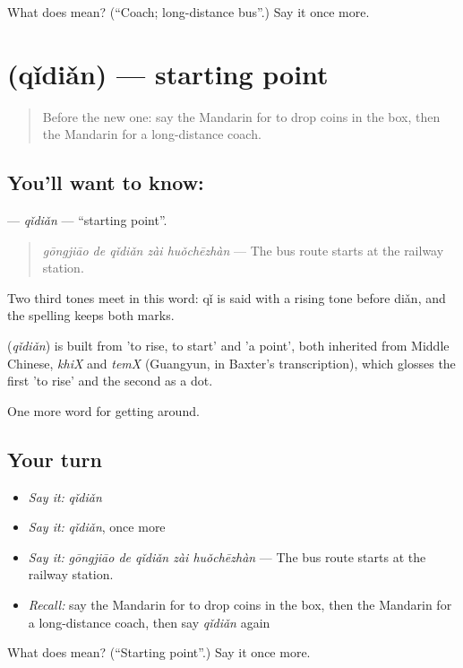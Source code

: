 \begin{tcolorbox}[breakable,colback=teal!4,colframe=teal!35!black,title={Before you move on}]
What does  mean? (\textquotedblleft{}Coach; long-distance bus\textquotedblright{}.) Say it once more.
\end{tcolorbox}
\section[\texorpdfstring{\zh{起点} (qǐdiǎn)}{起点 (qǐdiǎn)}]{ (qǐdiǎn) — starting point}

\label{lesson:ZH-C408-qidian}



\begin{quote}
Before the new one: say the Mandarin for to drop coins in the box, then the Mandarin for a long-distance coach.
\end{quote}

\subsection*{You'll want to know: }
\textbf{} — \emph{qǐdiǎn} — \textquotedblleft{}starting point\textquotedblright{}.

\begin{quote}
\textbf{} \emph{gōngjiāo de qǐdiǎn zài huǒchēzhàn} — The bus route starts at the railway station.
\end{quote}

Two third tones meet in this word: qǐ is said with a rising tone before diǎn, and the spelling keeps both marks.

\begin{cousinweb}
\textbf{} (\emph{qǐdiǎn}) is built from  'to rise, to start' and  'a point', both inherited from Middle Chinese, \emph{khiX} and \emph{temX} (Guangyun, in Baxter's transcription), which glosses the first 'to rise' and the second as a dot.
\end{cousinweb}

\begin{grammarlens}[title={What you've built}]
One more word for getting around.
\end{grammarlens}

\subsection*{Your turn}
\begin{itemize}
\raggedright
  \item \emph{Say it:} \emph{qǐdiǎn}
  \item \emph{Say it:} \emph{qǐdiǎn}, once more
  \item \emph{Say it:} \emph{gōngjiāo de qǐdiǎn zài huǒchēzhàn} — The bus route starts at the railway station.
  \item \emph{Recall:} say the Mandarin for to drop coins in the box, then the Mandarin for a long-distance coach, then say \emph{qǐdiǎn} again
\end{itemize}

\begin{tcolorbox}[breakable,colback=teal!4,colframe=teal!35!black,title={Before you move on}]
What does  mean? (\textquotedblleft{}Starting point\textquotedblright{}.) Say it once more.
\end{tcolorbox}

